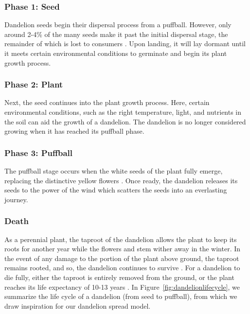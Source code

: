 \subsubsection{Phase 1: Seed}
Dandelion seeds begin their dispersal process from a puffball. However, only around 2-4\% of the many seeds make it past the initial dispersal stage, the remainder of which is lost to consumers \cite{noauthor_dandelion_nodate-2}. Upon landing, it will lay dormant until it meets certain environmental conditions to germinate and begin its plant growth process. 


\subsubsection{Phase 2: Plant}
Next, the seed continues into the plant growth process. Here, certain environmental conditions, such as the right temperature, light, and nutrients in the soil can aid the growth of a dandelion. The dandelion is no longer considered growing when it has reached its puffball phase.

\subsubsection{Phase 3: Puffball}
The puffball stage occurs when the white seeds of the plant fully emerge, replacing the distinctive yellow flowers  \cite{board_of_pesticides_control_maine_dacf_dandelion-taraxacum_nodate}. Once ready, the dandelion releases its seeds to the power of the wind which scatters the seeds into an everlasting journey.

\subsubsection{Death}
As a perennial plant, the taproot of the dandelion allows the plant to keep its roots for another year while the flowers and stem wither away in the winter. In the event of any damage to the portion of the plant above ground, the taproot remains rooted, and so, the dandelion continues to survive \cite{farmshowGrowingDandelions}. For a dandelion to die fully, either the taproot is entirely removed from the ground, or the plant reaches its life expectancy of 10-13 years \cite{noauthor_garden_nodate}. In Figure~\ref{fig:dandelionlifecycle}, we summarize the life cycle of a dandelion (from seed to puffball), from which we draw inspiration for our dandelion spread model.

